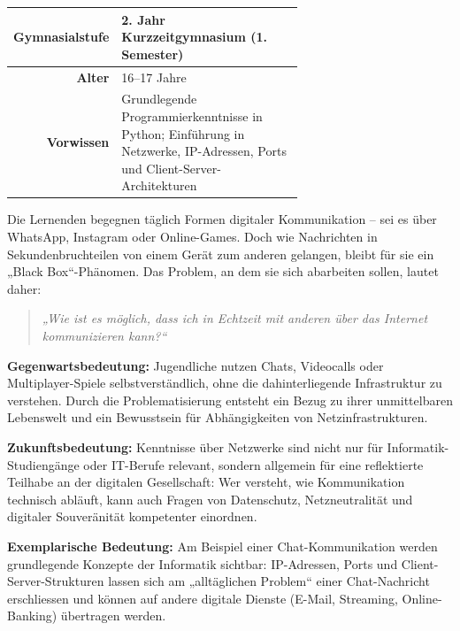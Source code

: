 \begin{tcolorbox}[colback=blue!5!white, colframe=blue!80!black, title=Kontext]
    \begin{table}[H]
        \centering
        \renewcommand{\arraystretch}{1.2}
        \begin{tabular}{@{}r|p{0.65\linewidth}@{}}
            \textbf{Gymnasialstufe} & 2. Jahr Kurzzeitgymnasium (1. Semester)                                                                                   \\
            \midrule
            \textbf{Alter}          & 16–17 Jahre                                                                                                               \\
            \midrule
            \textbf{Vorwissen}      & Grundlegende Programmierkenntnisse in Python; Einführung in Netzwerke, IP-Adressen, Ports und Client-Server-Architekturen \\
        \end{tabular}
    \end{table}
\end{tcolorbox}

Die Lernenden begegnen täglich Formen digitaler Kommunikation – sei es über WhatsApp, Instagram oder Online-Games. Doch wie Nachrichten in Sekundenbruchteilen von einem Gerät zum anderen gelangen, bleibt für sie ein „Black Box“-Phänomen. Das Problem, an dem sie sich abarbeiten sollen, lautet daher:

\begin{quote}
    \textit{„Wie ist es möglich, dass ich in Echtzeit mit anderen über das Internet kommunizieren kann?“}
\end{quote}

\textbf{Gegenwartsbedeutung:} Jugendliche nutzen Chats, Videocalls oder Multiplayer-Spiele selbstverständlich, ohne die dahinterliegende Infrastruktur zu verstehen. Durch die Problematisierung entsteht ein Bezug zu ihrer unmittelbaren Lebenswelt und ein Bewusstsein für Abhängigkeiten von Netzinfrastrukturen.

\textbf{Zukunftsbedeutung:} Kenntnisse über Netzwerke sind nicht nur für Informatik-Studiengänge oder IT-Berufe relevant, sondern allgemein für eine reflektierte Teilhabe an der digitalen Gesellschaft: Wer versteht, wie Kommunikation technisch abläuft, kann auch Fragen von Datenschutz, Netzneutralität und digitaler Souveränität kompetenter einordnen.

\textbf{Exemplarische Bedeutung:} Am Beispiel einer Chat-Kommunikation werden grundlegende Konzepte der Informatik sichtbar: IP-Adressen, Ports und Client-Server-Strukturen lassen sich am „alltäglichen Problem“ einer Chat-Nachricht erschliessen und können auf andere digitale Dienste (E-Mail, Streaming, Online-Banking) übertragen werden.

